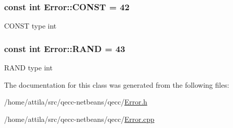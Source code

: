 \subsubsection[{\texorpdfstring{C\+O\+N\+ST}{CONST}}]{\setlength{\rightskip}{0pt plus 5cm}const int Error\+::\+C\+O\+N\+ST = 42\hspace{0.3cm}{\ttfamily [static]}}\hypertarget{class_error_a0f92db18254bcb69e96363e3cc696453}{}\label{class_error_a0f92db18254bcb69e96363e3cc696453}
C\+O\+N\+ST type int 
\subsubsection[{\texorpdfstring{R\+A\+ND}{RAND}}]{\setlength{\rightskip}{0pt plus 5cm}const int Error\+::\+R\+A\+ND = 43\hspace{0.3cm}{\ttfamily [static]}}\hypertarget{class_error_aa2dfc83f8a57b08d80000df840fd2103}{}\label{class_error_aa2dfc83f8a57b08d80000df840fd2103}
R\+A\+ND type int 

The documentation for this class was generated from the following files\+:\begin{DoxyCompactItemize}
\item 
/home/attila/src/qecc-\/netbeans/qecc/\hyperlink{_error_8h}{Error.\+h}\item 
/home/attila/src/qecc-\/netbeans/qecc/\hyperlink{_error_8cpp}{Error.\+cpp}\end{DoxyCompactItemize}
